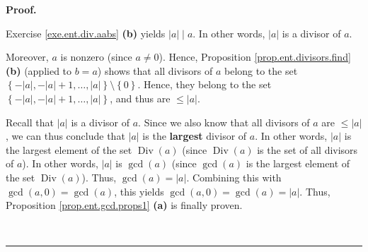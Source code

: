 \documentclass[numbers=enddot,12pt,final,onecolumn,notitlepage]{scrartcl}%
\numberwithin{exer}{subsection}
\theoremstyle{definition}
\newenvironment{fineprint}{\begin{small}}{\end{small}}
\newenvironment{proof}[1][Proof]{\noindent\textbf{#1.} }{\ \rule{0.5em}{0.5em}}
\begin{document}
\begin{proof}
\begin{fineprint}
Exercise \ref{exe.ent.div.aabs} \textbf{(b)} yields $\left\vert a\right\vert
\mid a$. In other words, $\left\vert a\right\vert $ is a divisor of $a$.

Moreover, $a$ is nonzero (since $a\neq0$). Hence, Proposition
\ref{prop.ent.divisors.find} \textbf{(b)} (applied to $b=a$) shows that all
divisors of $a$ belong to the set $\left\{  -\left\vert a\right\vert
,-\left\vert a\right\vert +1,\ldots,\left\vert a\right\vert \right\}
\setminus\left\{  0\right\}  $. Hence, they belong to the set $\left\{
-\left\vert a\right\vert ,-\left\vert a\right\vert +1,\ldots,\left\vert
a\right\vert \right\}  $, and thus are $\leq\left\vert a\right\vert $.

Recall that $\left\vert a\right\vert $ is a divisor of $a$. Since we also know
that all divisors of $a$ are $\leq\left\vert a\right\vert $, we can thus
conclude that $\left\vert a\right\vert $ is the \textbf{largest} divisor of
$a$. In other words, $\left\vert a\right\vert $ is the largest element of the
set $\operatorname*{Div}\left(  a\right)  $ (since $\operatorname*{Div}\left(
a\right)  $ is the set of all divisors of $a$). In other words, $\left\vert
a\right\vert $ is $\gcd\left(  a\right)  $ (since $\gcd\left(  a\right)  $ is
the largest element of the set $\operatorname*{Div}\left(  a\right)  $). Thus,
$\gcd\left(  a\right)  =\left\vert a\right\vert $. Combining this with
$\gcd\left(  a,0\right)  =\gcd\left(  a\right)  $, this yields $\gcd\left(
a,0\right)  =\gcd\left(  a\right)  =\left\vert a\right\vert $. Thus,
Proposition \ref{prop.ent.gcd.props1} \textbf{(a)} is finally proven.
\end{fineprint}


\end{proof}
\end{document}

